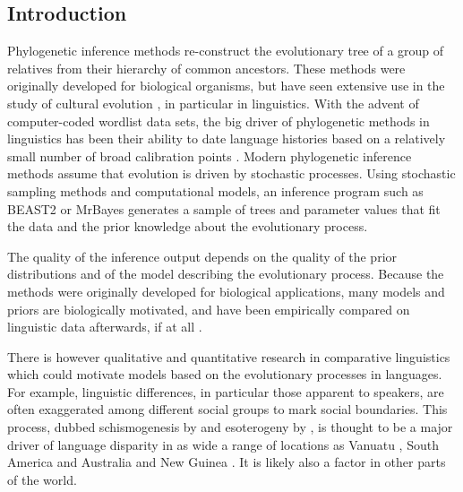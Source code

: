 \documentclass[]{rsos}%
\begin{document}
\begin{fmtext}
\section{Introduction}
Phylogenetic inference methods re-construct the evolutionary tree of a group of
relatives from their hierarchy of common ancestors.
These methods were originally developed for biological organisms, but have seen extensive
use in the study of cultural evolution \parencite{evans2021uses}, in particular in
linguistics. With the advent of computer-coded wordlist data sets, the big driver of
phylogenetic methods in linguistics has been their ability to date language
histories based on a relatively small number of broad calibration points
\parencite{borchsenius2017phylogenetics}.
Modern phylogenetic inference methods assume that evolution is driven by
stochastic processes. Using stochastic sampling methods and computational models,
an inference program such as BEAST2 \parencite{beast2} or MrBayes \parencite{mrbayes}
generates a sample of trees and parameter values that fit the data and the prior knowledge
about the evolutionary process.

The quality of the inference output depends on the quality of the prior distributions
and of the model describing the evolutionary process. Because the methods were originally
developed for biological applications, many models and priors are biologically motivated,
and have been empirically compared on linguistic data afterwards, if at all \parencite{kaiping2021systematic,rama2018three}.

There is however qualitative and quantitative research in comparative linguistics
which could motivate models based on the evolutionary processes in languages.
For example, linguistic differences, in particular those apparent to speakers, are often
exaggerated among different social groups to mark social boundaries. This
process, dubbed schismogenesis by \textcite{bateson1935culture} and esoterogeny
by \textcite{thurston1987processes}, is thought to be a major driver of language disparity in
as wide a range of locations as Vanuatu \parencite{francois2011social}, South America \parencite{epps2020amazonian}
and Australia and New Guinea \parencite{evans2019linguistic}. It is likely also a factor in other parts of the world.
\end{fmtext}
\maketitle
\end{document}
